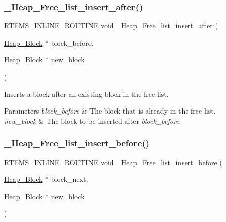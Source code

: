 \subsubsection{\texorpdfstring{\_Heap\_Free\_list\_insert\_after()}{\_Heap\_Free\_list\_insert\_after()}}
{\footnotesize\ttfamily \mbox{\hyperlink{group__RTEMSScoreBaseDefs_gac216239df231d5dbd15e3520b0b9313f}{R\+T\+E\+M\+S\+\_\+\+I\+N\+L\+I\+N\+E\+\_\+\+R\+O\+U\+T\+I\+NE}} void \+\_\+\+Heap\+\_\+\+Free\+\_\+list\+\_\+insert\+\_\+after (\begin{DoxyParamCaption}\item[{\mbox{\hyperlink{structHeap__Block}{Heap\+\_\+\+Block}} $\ast$}]{block\+\_\+before,  }\item[{\mbox{\hyperlink{structHeap__Block}{Heap\+\_\+\+Block}} $\ast$}]{new\+\_\+block }\end{DoxyParamCaption})}



Inserts a block after an existing block in the free list. 


\begin{DoxyParams}{Parameters}
{\em block\+\_\+before} & The block that is already in the free list. \\
\hline
{\em new\+\_\+block} & The block to be inserted after {\itshape block\+\_\+before}. \\
\hline
\end{DoxyParams}
\mbox{\label{group__RTEMSScoreHeap_ga5c27f15a2fb2b9e662eba8e023e02ce8}} 
\subsubsection{\texorpdfstring{\_Heap\_Free\_list\_insert\_before()}{\_Heap\_Free\_list\_insert\_before()}}
{\footnotesize\ttfamily \mbox{\hyperlink{group__RTEMSScoreBaseDefs_gac216239df231d5dbd15e3520b0b9313f}{R\+T\+E\+M\+S\+\_\+\+I\+N\+L\+I\+N\+E\+\_\+\+R\+O\+U\+T\+I\+NE}} void \+\_\+\+Heap\+\_\+\+Free\+\_\+list\+\_\+insert\+\_\+before (\begin{DoxyParamCaption}\item[{\mbox{\hyperlink{structHeap__Block}{Heap\+\_\+\+Block}} $\ast$}]{block\+\_\+next,  }\item[{\mbox{\hyperlink{structHeap__Block}{Heap\+\_\+\+Block}} $\ast$}]{new\+\_\+block }\end{DoxyParamCaption})}



